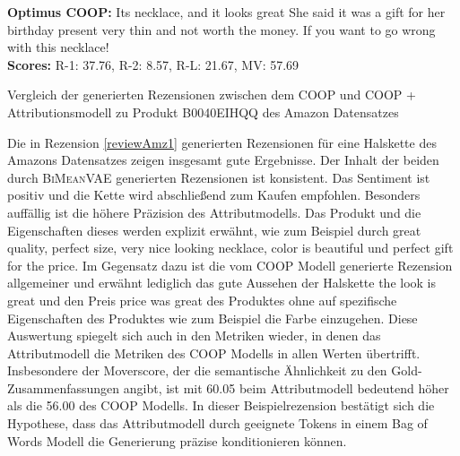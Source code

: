 \begin{Rezension}[!h]
{{        %
        \textbf{Optimus COOP:}  Its \ccolorbox[BackgroundColor]{ \textcolor{HighlightColor}{a beautiful}} \textcolor{HighlightColor}{necklace}\textcolor{HighlightColor}{,} \textcolor{HighlightColor}{and} \textcolor{HighlightColor}{it} looks \textcolor{HighlightColor}{great} \underline{\ccolorbox[BackgroundColor]{ \textcolor{HighlightColor}{for the}} \ccolorbox[BackgroundColor]{ \textcolor{HighlightColor}{price.}}} She said \textcolor{HighlightColor}{it} was \textcolor{HighlightColor}{a} gift \textcolor{HighlightColor}{for} her birthday present\ccolorbox[BackgroundColor]{\textcolor{HighlightColor}{, but}} \ccolorbox[BackgroundColor]{ \textcolor{HighlightColor}{it is}} \textcolor{HighlightColor}{very} \textcolor{HighlightColor}{thin} \textcolor{HighlightColor}{and} not worth \textcolor{HighlightColor}{the} money\textcolor{HighlightColor}{.} If \textcolor{HighlightColor}{you} want \textcolor{HighlightColor}{to} go wrong with \textcolor{HighlightColor}{this} \textcolor{HighlightColor}{necklace}\textcolor{HighlightColor}{!}  \\ 
        \textbf{Scores:} R-1: 37.76, R-2: 8.57, R-L: 21.67, MV: 57.69 }
    
        }
    \caption{Vergleich der generierten Rezensionen zwischen dem COOP und COOP + Attributionsmodell zu Produkt B0040EIHQQ des Amazon Datensatzes}
\label{reviewAmz1}
\end{Rezension}

Die in Rezension \ref{reviewAmz1} generierten Rezensionen für eine Halskette des Amazons Datensatzes zeigen insgesamt gute Ergebnisse.
Der Inhalt der beiden durch \textsc{BiMeanVAE} generierten Rezensionen ist konsistent. 
Das Sentiment ist positiv und die Kette wird abschließend zum Kaufen empfohlen. Besonders auffällig ist die höhere Präzision des Attributmodells. Das Produkt und die Eigenschaften dieses werden explizit erwähnt, wie zum Beispiel durch \glqq{}great quality\grqq{}, \glqq{}perfect size\grqq{}, \glqq{}very nice looking necklace\grqq{}, \glqq{}color is beautiful\grqq{} und \glqq{}perfect gift for the price\grqq{}.
Im Gegensatz dazu ist die vom COOP Modell generierte Rezension allgemeiner und erwähnt lediglich das gute Aussehen der Halskette \glqq{}the look is great\grqq{} und den Preis \glqq{}price was great\grqq{} des Produktes ohne auf spezifische Eigenschaften des Produktes wie zum Beispiel die Farbe einzugehen.
Diese Auswertung spiegelt sich auch in den Metriken wieder, in denen das Attributmodell die Metriken des COOP Modells in allen Werten übertrifft. 
Insbesondere der Moverscore, der die semantische Ähnlichkeit zu den Gold-Zusammenfassungen angibt, ist mit 60.05 beim Attributmodell bedeutend höher als die 56.00 des COOP Modells.
In dieser Beispielrezension bestätigt sich die Hypothese, dass das Attributmodell durch geeignete Tokens in einem Bag of Words Modell die Generierung präzise konditionieren können.

